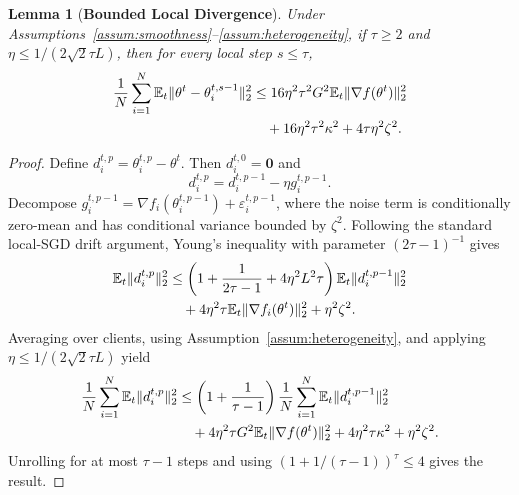 \documentclass[journal]{IEEEtran}
\newtheorem{lemma}{Lemma}
\begin{document}
\begin{lemma}[\bf Bounded Local Divergence]
    \label{lemma:local_div}
    Under Assumptions~\ref{assum:smoothness}--\ref{assum:heterogeneity}, if $\tau\ge2$ and $\eta\le 1/(2\sqrt{2}\tau L)$, then for every local step $s\le\tau$,
    \begin{align}
        \frac1N\sum_{i=1}^{N}\mathbb{E}_t\|\theta^t-\theta_i^{t,s-1}\|_2^2
        &\le
        16\eta^2\tau^2G^2\mathbb{E}_t\|\nabla f(\theta^t)\|_2^2
        \notag\\
        &\quad+16\eta^2\tau^2\kappa^2+4\tau\eta^2\zeta^2.
    \end{align}
\end{lemma}
\begin{proof}
    Define $d_i^{t,p}=\theta_i^{t,p}-\theta^t$. Then $d_i^{t,0}=\mathbf{0}$ and
    \begin{equation}
        d_i^{t,p}=d_i^{t,p-1}-\eta g_i^{t,p-1}.
    \end{equation}
    Decompose $g_i^{t,p-1}=\nabla f_i(\theta_i^{t,p-1})+\varepsilon_i^{t,p-1}$, where the noise term is conditionally zero-mean and has conditional variance bounded by $\zeta^2$. Following the standard local-SGD drift argument, Young's inequality with parameter $(2\tau-1)^{-1}$ gives
    \begin{align}
        \mathbb{E}_t\|d_i^{t,p}\|_2^2
        &\le
        \left(1+\frac{1}{2\tau-1}+4\eta^2L^2\tau\right)
        \mathbb{E}_t\|d_i^{t,p-1}\|_2^2
        \notag\\
        &\quad+4\eta^2\tau\mathbb{E}_t\|\nabla f_i(\theta^t)\|_2^2+\eta^2\zeta^2.
    \end{align}
    Averaging over clients, using Assumption~\ref{assum:heterogeneity}, and applying $\eta\le 1/(2\sqrt{2}\tau L)$ yield
    \begin{align}
        \frac1N\sum_{i=1}^{N}\mathbb{E}_t\|d_i^{t,p}\|_2^2
        &\le
        \left(1+\frac{1}{\tau-1}\right)
        \frac1N\sum_{i=1}^{N}\mathbb{E}_t\|d_i^{t,p-1}\|_2^2
        \notag\\
        &\quad+4\eta^2\tau G^2\mathbb{E}_t\|\nabla f(\theta^t)\|_2^2
        +4\eta^2\tau\kappa^2+\eta^2\zeta^2.
    \end{align}
    Unrolling for at most $\tau-1$ steps and using $(1+1/(\tau-1))^{\tau}\le4$ gives the result.
\end{proof}
\end{document}
